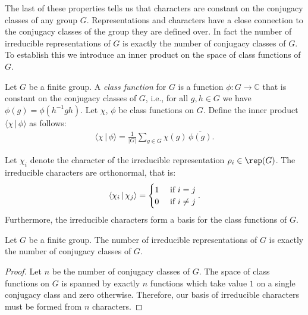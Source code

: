 \documentclass[11pt]{report}
\begin{document}
The last of these properties tells us that characters are constant on the 
conjugacy classes of any group $G$. Representations and characters have a close 
connection to the conjugacy classes of the group they are defined over. In fact 
the number of irreducible representations of $G$ is exactly the number of conjugacy classes of $G$. To establish this we introduce an inner product on the space of class functions of $G$.

\begin{defn}
	Let $G$ be a finite group. A \emph{class function} for $G$ is a function $\phi:G\to\mathbb{C}$ that is constant on the conjugacy classes of $G$, i.e., for all $g,h\in G$ we have $\phi(g) = \phi(h^{-1} gh)$.  
	Let $\chi$, $\phi$ be class functions on $G$. Define the inner product $\langle \chi \, | \, \phi \rangle$ as follows:
	\begin{eqnarray}
	\langle \chi \, | \, \phi \rangle = \frac{1}{|G|}\sum_{g\in G} \chi(g) \, \overline{\phi(g)}.
	\end{eqnarray}
\end{defn}

\begin{thm}
	Let $\chi_{i}$ denote the character of the irreducible representation $\rho_{i} \in \rep(G)$. The irreducible characters are orthonormal, that is:
	\[
	\langle \chi_{i} \, | \, \chi_{j} \rangle =\begin{cases}
	1 & \textnormal{ if } i =j \\
	0 & \textnormal{ if } i\neq j
	\end{cases}.\]
	Furthermore, the irreducible characters form a basis for the class functions of $G$.
\end{thm}

\begin{corollary}
	\label{chpt3:lem:dimsum}
	Let $G$ be a finite group. The number of irreducible representations of $G$ is exactly the number of conjugacy classes of $G$. 
\end{corollary}
\begin{proof}
	Let $n$ be the number of conjugacy classes of $G$. The space of class functions on $G$ is spanned by exactly $n$ functions which take value $1$ on a single conjugacy class and zero otherwise. Therefore, our basis of irreducible characters must be formed from $n$ characters.
\end{proof}
\end{document}
